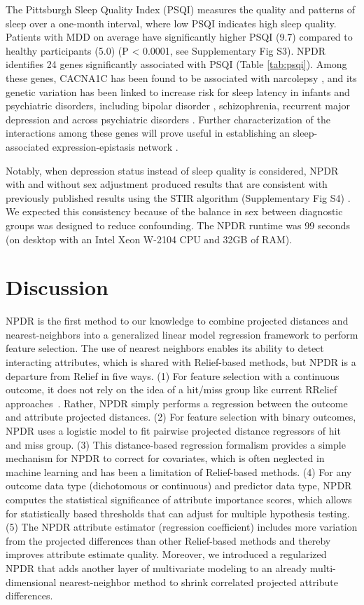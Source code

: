 \documentclass[10pt]{article}
\begin{document}
The Pittsburgh Sleep Quality Index (PSQI) measures the quality and patterns of sleep over a one-month interval, where low PSQI indicates high sleep quality.
Patients with MDD on average have significantly higher PSQI (9.7) compared to healthy participants (5.0) (P < 0.0001, see Supplementary Fig S3).
NPDR identifies 24 genes significantly associated with PSQI (Table \ref{tab:psqi}).
Among these genes, CACNA1C has been found to be associated with narcolepsy \cite{shimada2010}, and its genetic variation has been linked to increase risk for sleep latency in infants \cite{kantojarvi2017} and psychiatric disorders, including bipolar disorder \cite{franke2010}, schizophrenia, recurrent major depression \cite{green2009} and across psychiatric disorders \cite{crossdisorder2013, lotan2014}.
Further characterization of the interactions among these genes will prove useful in establishing an sleep-associated expression-epistasis network \cite{lareau15, mckinney2009capturing}.

Notably, when depression status instead of sleep quality is considered, NPDR with and without sex adjustment produced results that are consistent with previously published results using the STIR algorithm (Supplementary Fig S4) \cite{stir}.
We expected this consistency because of the balance in sex between diagnostic groups was designed to reduce confounding.
The NPDR runtime was 99 seconds (on desktop with an Intel Xeon W-2104 CPU and 32GB of RAM).


\section{Discussion}
NPDR is the first method to our knowledge to combine projected distances and nearest-neighbors into a generalized linear model regression framework to perform feature selection.
The use of nearest neighbors enables its ability to detect interacting attributes, which is shared with Relief-based methods, but NPDR is a departure from Relief in five ways.
(1) For feature selection with a continuous outcome, it does not rely on the idea of a hit/miss group like current RRelief approaches~\cite{urbanowicz17}.
Rather, NPDR simply performs a regression between the outcome and attribute projected distances.
(2) For feature selection with binary outcomes, NPDR uses a logistic model to fit pairwise projected distance regressors of hit and miss group.
(3) This distance-based regression formalism provides a simple mechanism for NPDR to correct for covariates, which is often neglected in machine learning and has been a limitation of Relief-based methods.
(4) For any outcome data type (dichotomous or continuous) and predictor data type, NPDR computes the statistical significance of attribute importance scores, which allows for statistically based thresholds that can adjust for multiple hypothesis testing.
(5) The NPDR attribute estimator (regression coefficient) includes more variation from the projected differences than other Relief-based methods and thereby improves attribute estimate quality.
Moreover, we introduced a regularized NPDR that adds another layer of multivariate modeling to an already multi-dimensional nearest-neighbor method to shrink correlated projected attribute differences.  
\end{document}
